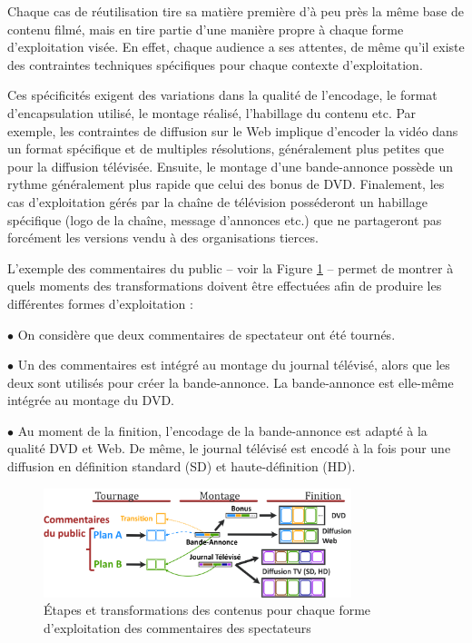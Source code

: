 Chaque cas de réutilisation tire sa matière première d'à peu près la même base de contenu filmé, mais en tire partie d'une manière propre à chaque forme d'exploitation visée. 
En effet, chaque audience a ses attentes, de même qu'il existe des contraintes techniques spécifiques pour chaque contexte d'exploitation. 

Ces spécificités exigent des variations dans la qualité de l'encodage, le format d'encapsulation utilisé, le montage réalisé, l'habillage du contenu etc. 
Par exemple, les contraintes de diffusion sur le Web implique d'encoder la vidéo dans un format spécifique et de multiples résolutions, généralement plus petites que pour la diffusion télévisée. 
Ensuite, le montage d'une bande-annonce possède un rythme généralement plus rapide que celui des bonus de DVD. 
Finalement, les cas d'exploitation gérés par la chaîne de télévision posséderont un habillage spécifique (logo de la chaîne, message d'annonces etc.) que ne partageront pas forcément les versions vendu à des organisations tierces. 

L'exemple des commentaires du public -- voir la Figure \ref{img:intro:reuse-process} -- permet de montrer à quels moments des transformations doivent être effectuées afin de produire les différentes formes d'exploitation :
\begin{liste} 
	\item[$\bullet$] On considère que deux commentaires de spectateur ont été tournés. 
	\item[$\bullet$] Un des commentaires est intégré au montage du journal télévisé, alors que les deux sont utilisés pour créer la bande-annonce. La bande-annonce est elle-même intégrée au montage du DVD. 
	\item[$\bullet$] Au moment de la finition, l'encodage de la bande-annonce est adapté à la qualité DVD et Web. De même, le journal télévisé est encodé à la fois pour une diffusion en définition standard (SD) et haute-définition (HD).
\end{liste}


\begin{figure}[ht!]
\centering
\includegraphics[width=0.8\textwidth]{images/EX-Content-Production-v7fr.png}
\caption{Étapes et transformations des contenus pour chaque forme d'exploitation des commentaires des spectateurs}
\label{img:intro:reuse-process}
\end{figure}


